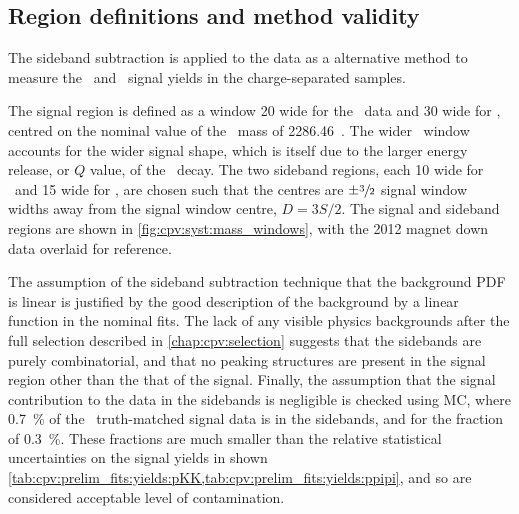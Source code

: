 \subsection{Region definitions and method validity}
\label{chap:cpv:syst:fit:defs}

The sideband subtraction is applied to the data as a alternative method to 
measure the \pKK\ and \ppipi\ signal yields in the charge-separated samples.

The signal region is defined as a window \SI{20}{\MeVcc} wide for the \pKK\ 
data and \SI{30}{\MeVcc} wide for \ppipi, centred on the nominal value of the 
\PLambdac\ mass of \SI{2286.46}{\MeVcc}~\cite{PDG2014}.
The wider \ppipi\ window accounts for the wider signal shape, which is itself 
due to the larger energy release, or $Q$ value, of the \ppipi\ decay.
The two sideband regions, each \SI{10}{\MeVcc} wide for \pKK\ and 
\SI{15}{\MeVcc} wide for \ppipi, are chosen such that the centres are 
$\pm\sfrac{3}{2}$ signal window widths away from the signal window centre, $D = 
3S/2$.
The signal and sideband regions are shown in \cref{fig:cpv:syst:mass_windows}, 
with the 2012 magnet down data overlaid for reference.

The assumption of the sideband subtraction technique that the background 
\ac{PDF} is linear is justified by the good description of the background by a 
linear function in the nominal fits.
The lack of any visible physics backgrounds after the full selection described 
in \cref{chap:cpv:selection} suggests that the sidebands are purely 
combinatorial, and that no peaking structures are present in the signal region 
other than the that of the signal.
Finally, the assumption that the signal contribution to the data in the 
sidebands is negligible is checked using \ac{MC}, where \SI{0.7}{\percent} of 
the \ppipi\ truth-matched signal data is in the sidebands, and for \pKK the 
fraction of \SI{0.3}{\percent}.
These fractions are much smaller than the relative statistical uncertainties on 
the signal yields in shown 
\cref{tab:cpv:prelim_fits:yields:pKK,tab:cpv:prelim_fits:yields:ppipi}, and so 
are considered acceptable level of contamination.

